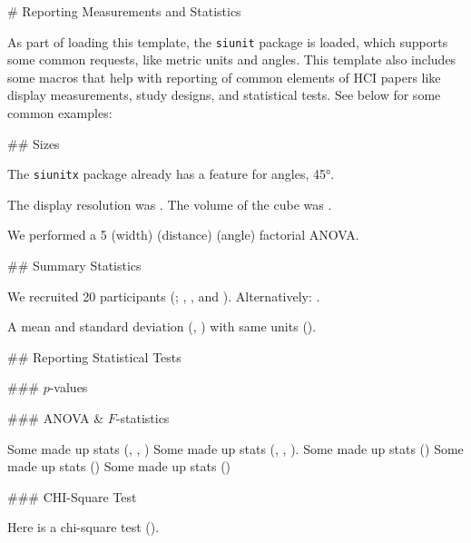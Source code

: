 \newpage
\begin{markdown}


# Reporting Measurements and Statistics

As part of loading this template, the \texttt{siunit} package is loaded, which supports some common requests, like metric units and angles. This template also includes some macros that help with reporting of common elements of HCI papers like display measurements, study designs, and statistical tests. See below for some common examples: 

## Sizes

The \texttt{siunitx} package already has a feature for angles, \ang{45}.

The display resolution was .
The volume of the cube was .

We performed a 5 (width) (distance) (angle) factorial ANOVA.


## Summary Statistics

We recruited 20 participants (; , , and ).
Alternatively: .

A mean and standard deviation (, ) with same units ().



## Reporting Statistical Tests

### $p$-values


### ANOVA \& $F$-statistics

Some made up stats (, , )
Some made up stats (, , ).
Some made up stats ()
Some made up stats ()
Some made up stats ()

### CHI-Square Test

Here is a chi-square test ().


\end{markdown}